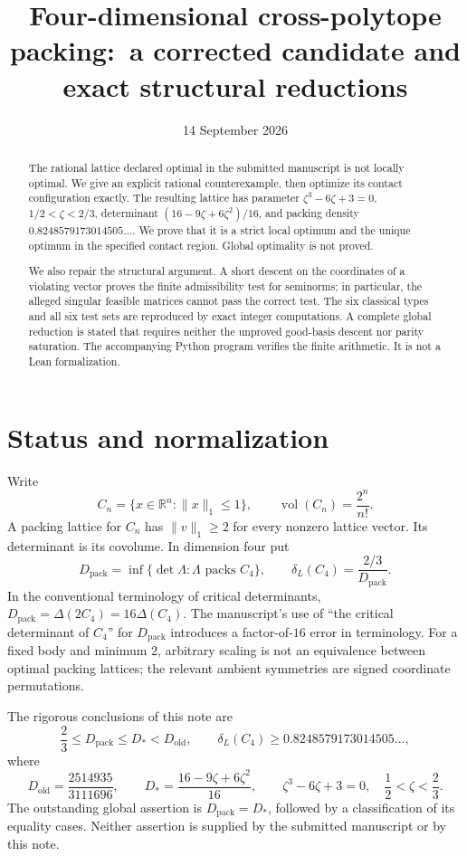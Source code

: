 \documentclass[11pt,reqno]{amsart}
\title[Cross-polytope packing: corrected candidate and reductions]{Four-dimensional cross-polytope packing:\
a corrected candidate and exact structural reductions}
\author{}
\date{14 September 2026}
\theoremstyle{definition}
\newcommand{\R}{\mathbb R}
\newcommand{\norm}[1]{\lVert #1\rVert_1}
\newcommand{\vol}{\operatorname{vol}}
\newcommand{\Dold}{D_{\mathrm{old}}}
\newcommand{\Dnew}{D_*}
\begin{document}
\begin{abstract}
The rational lattice declared optimal in the submitted manuscript is not
locally optimal. We give an explicit rational counterexample, then optimize
its contact configuration exactly. The resulting lattice has parameter
$\zeta^3-6\zeta+3=0$, $1/2<\zeta<2/3$, determinant
$(16-9\zeta+6\zeta^2)/16$, and packing density
$0.8248579173014505\ldots$. We prove that it is a strict local optimum and
the unique optimum in the specified contact region. Global optimality is
not proved.

We also repair the structural argument. A short descent on the coordinates
of a violating vector proves the finite admissibility test for seminorms;
in particular, the alleged singular feasible matrices cannot pass the
correct test. The six classical types and all six test sets are reproduced
by exact integer computations. A complete global reduction is stated that
requires neither the unproved good-basis descent nor parity saturation.
The accompanying Python program verifies the finite arithmetic. It is not
a Lean formalization.
\end{abstract}
\maketitle
\tableofcontents

\section{Status and normalization}
Write
\[
 C_n=\{x\in\R^n:\norm{x}\le1\},\qquad \vol(C_n)=\frac{2^n}{n!}.
\]
A packing lattice for $C_n$ has $\norm{v}\ge2$ for every nonzero lattice
vector. Its determinant is its covolume. In dimension four put
\[
 D_{\mathrm{pack}}=\inf\{\det\Lambda:\Lambda\text{ packs }C_4\},
 \qquad \delta_L(C_4)=\frac{2/3}{D_{\mathrm{pack}}}.
\]
In the conventional terminology of critical determinants,
$D_{\mathrm{pack}}=\Delta(2C_4)=16\Delta(C_4)$.
The manuscript's use of ``the critical determinant of $C_4$'' for
$D_{\mathrm{pack}}$ introduces a factor-of-$16$ error in terminology.
For a fixed body and minimum $2$, arbitrary scaling is not an equivalence
between optimal packing lattices; the relevant ambient symmetries are
signed coordinate permutations.

The rigorous conclusions of this note are
\begin{equation}\label{eq:status}
 \frac23\le D_{\mathrm{pack}}\le \Dnew<\Dold,
 \qquad
 \delta_L(C_4)\ge0.8248579173014505\ldots,
\end{equation}
where
\[
 \Dold=\frac{2514935}{3111696},\qquad
 \Dnew=\frac{16-9\zeta+6\zeta^2}{16},\qquad
 \zeta^3-6\zeta+3=0,\quad \frac12<\zeta<\frac23.
\]
The outstanding global assertion is $D_{\mathrm{pack}}=\Dnew$, followed
by a classification of its equality cases. Neither assertion is supplied
by the submitted manuscript or by this note.
\end{document}
